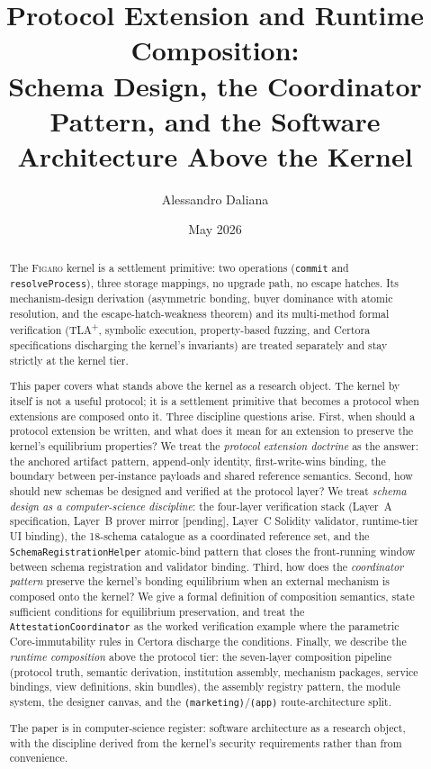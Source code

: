 \documentclass[11pt,a4paper]{article}
\title{%
  Protocol Extension and Runtime Composition:\\
  Schema Design, the Coordinator Pattern, and the Software Architecture
  Above the Kernel%
}
\author{
  Alessandro Daliana
}
\date{May 2026}
\theoremstyle{definition}
\theoremstyle{remark}
\newcommand{\figaro}{\textsc{Figaro}}
\begin{document}
\maketitle

\begin{abstract}
The \figaro{} kernel is a settlement primitive: two operations
(\texttt{commit} and \texttt{resolveProcess}), three storage mappings,
no upgrade path, no escape hatches. Its mechanism-design derivation
(asymmetric bonding, buyer dominance with atomic resolution, and the
escape-hatch-weakness theorem) and its multi-method formal
verification (TLA\textsuperscript{+}, symbolic execution,
property-based fuzzing, and Certora specifications discharging the
kernel's invariants) are treated separately and stay strictly at the
kernel tier.

This paper covers what stands above the kernel as a research object.
The kernel by itself is not a useful protocol; it is a settlement
primitive that becomes a protocol when extensions are composed onto
it. Three discipline questions arise. First, when should a protocol
extension be written, and what does it mean for an extension to
preserve the kernel's equilibrium properties? We treat the
\emph{protocol extension doctrine} as the answer: the anchored
artifact pattern, append-only identity, first-write-wins binding,
the boundary between per-instance payloads and shared reference
semantics. Second, how should new schemas be designed and verified
at the protocol layer? We treat \emph{schema design as a computer-science
discipline}: the four-layer verification stack (Layer~A
specification, Layer~B prover mirror [pending], Layer~C Solidity
validator, runtime-tier UI binding), the 18-schema catalogue as a
coordinated reference set, and the \texttt{SchemaRegistrationHelper}
atomic-bind pattern that closes the front-running window between
schema registration and validator binding. Third, how does the
\emph{coordinator pattern} preserve the kernel's bonding equilibrium
when an external mechanism is composed onto the kernel? We give a
formal definition of composition semantics, state sufficient
conditions for equilibrium preservation, and treat the
\texttt{AttestationCoordinator} as the worked verification example
where the parametric Core-immutability rules in Certora discharge
the conditions. Finally, we describe the \emph{runtime composition}
above the protocol tier: the seven-layer composition pipeline
(protocol truth, semantic derivation, institution assembly,
mechanism packages, service bindings, view definitions, skin
bundles), the assembly registry pattern, the module system, the
designer canvas, and the
\texttt{(marketing)}/\texttt{(app)} route-architecture split.

The paper is in computer-science register: software architecture as
a research object, with the discipline derived from the kernel's
security requirements rather than from convenience.
\end{abstract}
\end{document}
